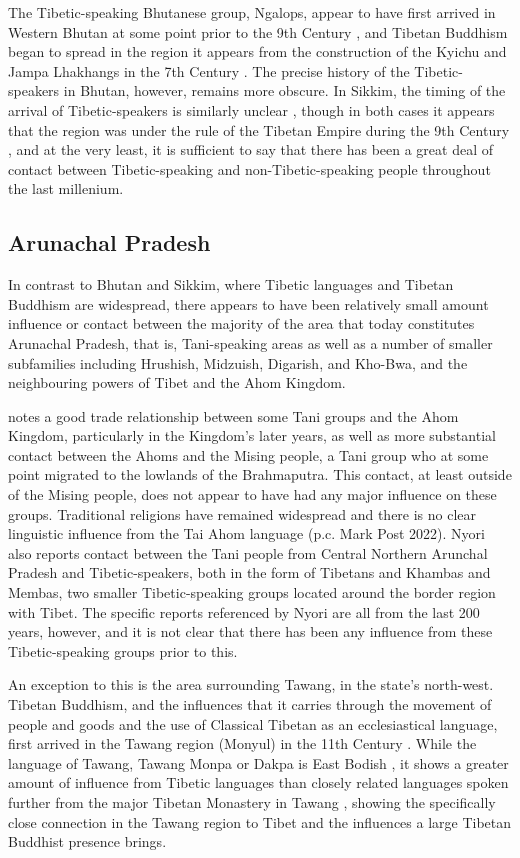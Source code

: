 The Tibetic-speaking Bhutanese group, Ngalops, appear to have first arrived in Western Bhutan at some point prior to the 9th Century \cite{VanDriem2001b}, and Tibetan Buddhism began to spread in the region it appears from the construction of the Kyichu and Jampa Lhakhangs in the 7th Century \cite{Phuntsho2014}. The precise history of the Tibetic-speakers in Bhutan, however, remains more obscure. In Sikkim, the timing of the arrival of Tibetic-speakers is similarly unclear \cites{Spengen2010}{Yliniemi2021}, though in both cases it appears that the region was under the rule of the Tibetan Empire during the 9th Century \cite{Schaik2013}, and at the very least, it is sufficient to say that there has been a great deal of contact between Tibetic-speaking and non-Tibetic-speaking people throughout the last millenium.

\subsection{Arunachal Pradesh}\label{ss:History:Arunachal}
In contrast to Bhutan and Sikkim, where Tibetic languages and Tibetan Buddhism are widespread, there appears to have been relatively small amount influence or contact between the majority of the area that today constitutes Arunachal Pradesh, that is, Tani-speaking areas as well as a number of smaller subfamilies including Hrushish, Midzuish, Digarish, and Kho-Bwa, and the neighbouring powers of Tibet and the Ahom Kingdom. 

 notes a good trade relationship between some Tani groups and the Ahom Kingdom, particularly in the Kingdom's later years, as well as more substantial contact between the Ahoms and the Mising people, a Tani group who at some point migrated to the lowlands of the Brahmaputra. This contact, at least outside of the Mising people, does not appear to have had any major influence on these groups. Traditional religions have remained widespread and there is no clear linguistic influence from the Tai Ahom language (p.c. Mark Post 2022). Nyori also reports contact between the Tani people from Central Northern Arunchal Pradesh and Tibetic-speakers, both in the form of Tibetans and Khambas and Membas, two smaller Tibetic-speaking groups located around the border region with Tibet. The specific reports referenced by Nyori are all from the last 200 years, however, and it is not clear that there has been any influence from these Tibetic-speaking groups prior to this.

An exception to this is the area surrounding Tawang, in the state's north-west. Tibetan Buddhism, and the influences that it carries through the movement of people and goods and the use of Classical Tibetan as an ecclesiastical language, first arrived in the Tawang region (Monyul) in the 11th Century \cite{Namgyal2020}. While the language of Tawang, Tawang Monpa or Dakpa is East Bodish \cite{Tombleson2020}, it shows a greater amount of influence from Tibetic languages than closely related languages spoken further from the major Tibetan Monastery in Tawang \cite{vanDriem2007}, showing the specifically close connection in the Tawang region to Tibet and the influences a large Tibetan Buddhist presence brings.

